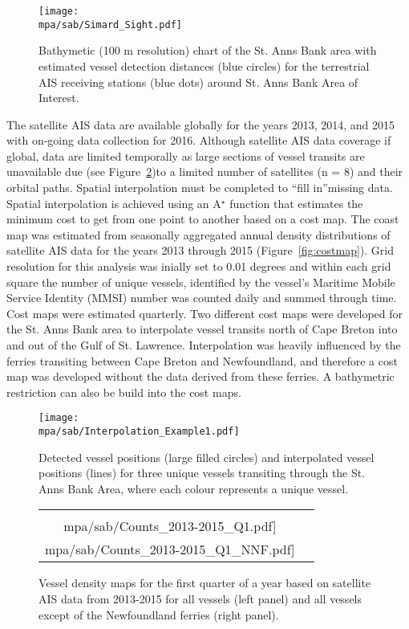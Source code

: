 \documentclass[letterpaper,portrait,11pt]{scrartcl}
\numberwithin{equation}{section}		%
\numberwithin{figure}{section}		%
\numberwithin{table}{section}				%
\newcommand*{\D}{.}
\newcommand{\biodata}{\string~/bio\D data}   %
\newcommand{\mpa}{\biodata/bio\D indicators/mpa}  %
\begin{document}
\begin{figure}[h]
	\centering
	\texttt{[image: \\mpa/sab/Simard\_Sight.pdf]}
	\caption{Bathymetic (100 m resolution) chart of the  St. Anns Bank area with  \textcite{Simard2014shipping} estimated vessel detection distances (blue circles) for the terrestrial AIS receiving stations (blue dots) around St. Anns Bank Area of Interest.}
  \label{fig:DetAIS}
\end{figure}


The satellite AIS data are available globally for the years 2013, 2014, and 2015 with on-going data collection for 2016. Although satellite AIS data coverage if global, data are limited temporally as large sections of vessel transits are unavailable due (see Figure~\ref{fig:astar})to a limited number of satellites (n = 8) and their orbital paths.  Spatial interpolation must be completed to \textquotedblleft fill in\textquotedblright  missing data.  Spatial interpolation is achieved using an A$^{\star}$ function \parencite{hart1968formal} that estimates the minimum cost to get from one point to another based on a cost map.  The coast map was estimated from seasonally aggregated annual density distributions of satellite AIS data for the years 2013 through 2015 (Figure~\ref{fig:costmap}).  Grid resolution for this analysis was inially set to 0.01 degrees and within each grid square the number of unique vessels, identified by the vessel's Maritime Mobile Service Identity (MMSI) number was counted daily and summed through time.  Cost maps were estimated quarterly.  Two different cost maps were developed for the St. Anns Bank area to interpolate vessel transits north of Cape Breton into and out of the Gulf of St. Lawrence.  Interpolation was heavily influenced by the ferries transiting between Cape Breton and Newfoundland, and therefore a cost map was developed without the data derived from these ferries.  A bathymetric restriction can also be build into the cost maps.

\begin{figure}[h]
	\centering
	\texttt{[image: \\mpa/sab/Interpolation\_Example1.pdf]}
	\caption{Detected vessel positions (large filled circles) and interpolated vessel positions (lines) for three unique vessels transiting through the St. Anns Bank Area, where each colour represents a unique vessel.}
	\label{fig:astar}
\end{figure}


\begin{figure}[h]

	\centering
	\begin{tabular}{cc}
		\texttt{[image: \\mpa/sab/Counts\_2013-2015\_Q1.pdf]} &
		\texttt{[image: \\mpa/sab/Counts\_2013-2015\_Q1\_NNF.pdf]}
	\end{tabular}
	\caption{Vessel density maps for the first quarter of a year based on satellite AIS data from 2013-2015 for all vessels (left panel) and all vessels except of the Newfoundland ferries (right panel).}
	\label{fig:countmaps}
\end{figure}
\end{document}
